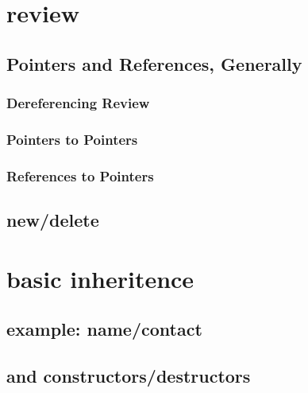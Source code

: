 
\begin{frame}
    \titlepage
\end{frame}

\section{review}

\subsection{Pointers and References, Generally}





\subsubsection{Dereferencing Review}



\subsubsection{Pointers to Pointers}



\subsubsection{References to Pointers}



\subsection{new/delete}



%

\section{basic inheritence}

\subsection{example: name/contact}



\subsection{and constructors/destructors}

